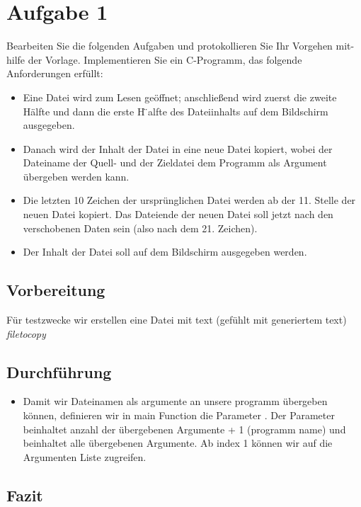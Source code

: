 \section{Aufgabe 1}
Bearbeiten Sie die folgenden Aufgaben und protokollieren Sie Ihr Vorgehen mit-
hilfe der Vorlage.
Implementieren Sie ein C-Programm, das folgende Anforderungen erfüllt:
\begin{itemize}
	\item Eine Datei wird zum Lesen geöffnet; anschließend wird zuerst die zweite
	Hälfte und dann die erste H ̈alfte des Dateiinhalts auf dem Bildschirm ausgegeben.
	\item  Danach wird der Inhalt der Datei in eine neue Datei kopiert, wobei der Dateiname der
Quell- und der Zieldatei dem Programm als Argument übergeben	werden kann.
\item  Die letzten 10 Zeichen der ursprünglichen Datei werden ab der 11. Stelle der neuen Datei
kopiert. Das Dateiende der neuen Datei soll jetzt nach den verschobenen Daten sein (also
nach dem 21. Zeichen).
\item Der Inhalt der Datei soll auf dem Bildschirm ausgegeben werden.


\end{itemize}

	\subsection{Vorbereitung}
	Für testzwecke wir erstellen eine Datei mit text (gefühlt mit generiertem text)
	\textit{filetocopy}
	\subsection{Durchführung}
	\begin{itemize}
		\item Damit wir Dateinamen als argumente an unsere programm übergeben können, definieren wir in main
		Function die Parameter . Der Parameter
		 beinhaltet anzahl der übergebenen Argumente + 1 (programm name) und
		 beinhaltet alle übergebenen Argumente. Ab index 1 können wir auf die Argumenten Liste
		zugreifen.
		
\end{itemize}


	\subsection{Fazit}

\newpage
